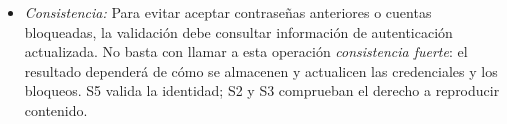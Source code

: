 \begin{itemize}
\begin{itemize}
        \item \textit{Consistencia:}
        Para evitar aceptar contraseñas anteriores o cuentas bloqueadas, la validación debe consultar información de autenticación actualizada. No basta con llamar a esta operación \emph{consistencia fuerte}: el resultado dependerá de cómo se almacenen y actualicen las credenciales y los bloqueos. S5 valida la identidad; S2 y S3 comprueban el derecho a reproducir contenido.
    \end{itemize}

\end{itemize}
